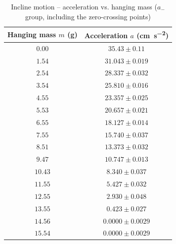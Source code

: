 \begin{table}[htb!]
\centering
\caption{Incline motion -- acceleration vs. hanging mass ($a_{-}$ group, including the zero-crossing points)}
\begin{tabular}{cc}
\toprule
Hanging mass $m$ (\unit{\g}) & Acceleration $a$ (\unit{\cm\per\s\squared}) \\
\midrule
$0.00$ & $35.43 \pm 0.11$ \\
$1.54$ & $31.043 \pm 0.019$ \\
$2.54$ & $28.337 \pm 0.032$ \\
$3.54$ & $25.810 \pm 0.016$ \\
$4.55$ & $23.357 \pm 0.025$ \\
$5.53$ & $20.657 \pm 0.021$ \\
$6.55$ & $18.127 \pm 0.014$ \\
$7.55$ & $15.740 \pm 0.037$ \\
$8.51$ & $13.373 \pm 0.032$ \\
$9.47$ & $10.747 \pm 0.013$ \\
$10.43$ & $8.340 \pm 0.037$ \\
$11.55$ & $5.427 \pm 0.032$ \\
$12.55$ & $2.930 \pm 0.048$ \\
$13.55$ & $0.423 \pm 0.027$ \\
$14.56$ & $0.0000 \pm 0.0029$ \\
$15.54$ & $0.0000 \pm 0.0029$ \\
\bottomrule
\end{tabular}
\end{table}
